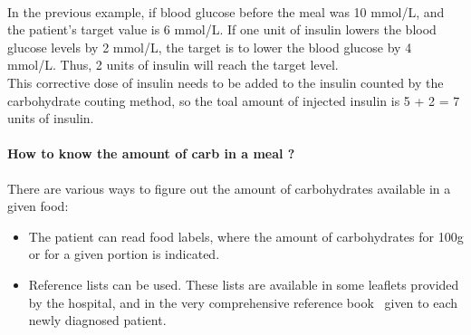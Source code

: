 \paragraph{}In the previous example, if blood glucose before the meal was 10 mmol/L, and the patient's target value is 6 mmol/L. If one unit of insulin lowers the blood glucose levels by 2 mmol/L, the target is to lower the blood glucose by 4 mmol/L. Thus, 2 units of insulin will reach the target level.
\\This corrective dose of insulin needs to be added to the insulin counted by the carbohydrate couting method, so the toal amount of injected insulin is 5 + 2 = 7 units of insulin.

\paragraph{How to know the amount of carb in a meal ?}
There are various ways to figure out the amount of carbohydrates available in a given food:
\begin{itemize}
\item The patient can read food labels, where the amount of carbohydrates for 100g or for a given portion is indicated.
\item Reference lists can be used. These lists are available in some leaflets provided by the hospital, and in the very comprehensive reference book~\cite{cheyette2010carbs} given to each newly diagnosed patient. 
\end{itemize}


